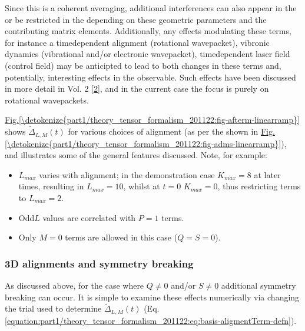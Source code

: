 \documentclass[letterpaper,table,10pt,english]{jupyterBook}
\begin{document}
\sphinxAtStartPar
Since this is a coherent averaging, additional interferences can also appear in the {\hyperref[\detokenize{backmatter/glossary:term-AF}]{}} \sphinxhyphen{} or be restricted in the {\hyperref[\detokenize{backmatter/glossary:term-AF}]{}} \sphinxhyphen{} depending on these geometric parameters and the contributing matrix elements. Additionally, any effects modulating these terms, for instance a time\sphinxhyphen{}dependent alignment (rotational wavepacket), vibronic dynamics (vibrational and/or electronic wavepacket), time\sphinxhyphen{}dependent laser field (control field) may be anticipted to lead to both changes in these terms and, potentially, interesting effects in the observable. Such effects have been discussed in more detail in  Vol. 2 {[}\hyperlink{cite.backmatter/bibliography:id570}{2}{]}, and in the current case the focus is purely on rotational wavepackets.

\sphinxAtStartPar
\hyperref[\detokenize{part1/theory_tensor_formalism_201122:fig-afterm-linearramp}]{Fig.\@ \ref{\detokenize{part1/theory_tensor_formalism_201122:fig-afterm-linearramp}}} shows \(\tilde{\Delta}_{L,M}(t)\) for various choices of alignment (as per the {\hyperref[\detokenize{backmatter/glossary:term-ADMs}]{}} shown in \hyperref[\detokenize{part1/theory_tensor_formalism_201122:fig-adms-linearramp}]{Fig.\@ \ref{\detokenize{part1/theory_tensor_formalism_201122:fig-adms-linearramp}}}), and illustrates some of the general features discussed. Note, for example:
\begin{itemize}
\item {} 
\sphinxAtStartPar
\(L_{max}\) varies with alignment; in the demonstration case \(K_{max}=8\) at later times, resulting in \(L_{max}=10\), whilst at \(t=0\) \(K_{max}=0\), thus restricting terms to \(L_{max}=2\).

\item {} 
\sphinxAtStartPar
Odd\sphinxhyphen{}\(L\) values are correlated with \(P=1\) terms.

\item {} 
\sphinxAtStartPar
Only \(M=0\) terms are allowed in this case (\(Q=S=0\)).

\end{itemize}


\subsubsection{3D alignments and symmetry breaking}
\label{\detokenize{part1/theory_tensor_formalism_201122:d-alignments-and-symmetry-breaking}}\label{\detokenize{part1/theory_tensor_formalism_201122:sec-theory-af-alignment-term-3d}}
\sphinxAtStartPar
As discussed above, for the case where \(Q\neq0\) and/or \(S\neq0\) additional symmetry breaking can occur. It is simple to examine these effects numerically via changing the trial {\hyperref[\detokenize{backmatter/glossary:term-ADMs}]{}} used to determine \(\tilde{\Delta}_{L,M}(t)\) (Eq. \eqref{equation:part1/theory_tensor_formalism_201122:eq:basis-aligmentTerm-defn}).
\end{document}

